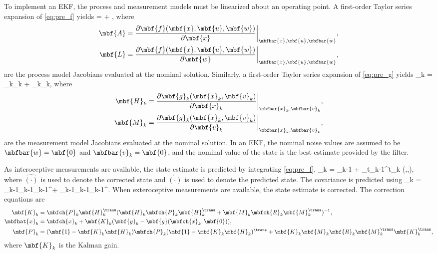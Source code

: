 To implement an EKF, the process and measurement models must be linearized about an operating point. A first-order Taylor series expansion of \eqref{eq:pre_f} yields
\bdis
	\delta {} =  + ,
\edis
where 
\begin{align*}
	\mbf{A} & = \frac{\partial\mbf{f}(\mbf{x},\mbf{u},\mbf{w})}{\partial\mbf{x}}\bigg\rvert_{\mbfbar{x},\mbf{u},\mbfbar{w}}, \\
	\mbf{L} & = \frac{\partial\mbf{f}(\mbf{x},\mbf{u},\mbf{w})}{\partial\mbf{w}}\bigg\rvert_{\mbfbar{x},\mbf{u},\mbfbar{w}},
\end{align*}
are the process model Jacobians evaluated at the nominal solution. Similarly, a first-order Taylor series expansion of \eqref{eq:pre_g} yields
\bdis
	_k = _k_k + _k_k,
\edis
where
\begin{align*}
	\mbf{H}_k & = \frac{\partial\mbf{g}_k(\mbf{x}_k,\mbf{v}_k)}{\partial\mbf{x}_k}\bigg\rvert_{\mbfbar{x}_k,\mbfbar{v}_k}, \\
	\mbf{M}_k & = \frac{\partial\mbf{g}_k(\mbf{x}_k,\mbf{v}_k)}{\partial\mbf{v}_k}\bigg\rvert_{\mbfbar{x}_k,\mbfbar{v}_k},
\end{align*}
are the measurement model Jacobians evaluated at the nominal solution. In an EKF, the nominal noise values are assumed to be $\mbfbar{w} = \mbf{0}$ and $\mbfbar{v}_k = \mbf{0}$, and the nominal value of the state is the best estimate provided by the filter. 

As interoceptive measurements are available, the state estimate is predicted by integrating \eqref{eq:pre_f},
\bdis
	_k = _{k-1} + \int_{t_{k-1}}^{t_k} (,,)\dt,
\edis
where $\hat{(\cdot)}$ is used to denote the corrected state and $\check{(\cdot)}$ is used to denote the predicted state. 
The covariance is predicted using
\bdis
	_k = _{k-1}_{k-1}_{k-1}^\trans + _{k-1}_{k-1}_{k-1}^\trans.
\edis
When exteroceptive measurements are available, the state estimate is corrected. The correction equations are  
\begin{align*}
	\mbf{K}_k &= \mbfch{P}_k\mbf{H}_k^\trans(\mbf{H}_k\mbfch{P}_k\mbf{H}_k^\trans + \mbf{M}_k\mbfch{R}_k\mbf{M}_k^\trans)^{-1}, \\
	\mbfhat{x}_k &= \mbfch{x}_k + \mbf{K}_k(\mbf{y}_k - \mbf{g}(\mbfch{x}_k,\mbf{0})), \\
	\mbf{P}_k &= (\mbf{1} - \mbf{K}_k\mbf{H}_k)\mbfch{P}_k(\mbf{1} - \mbf{K}_k\mbf{H}_k)^\trans + \mbf{K}_k\mbf{M}_k\mbf{R}_k\mbf{M}_k^\trans\mbf{K}_k^\trans,
\end{align*}
where $\mbf{K}_k$ is the Kalman gain.

